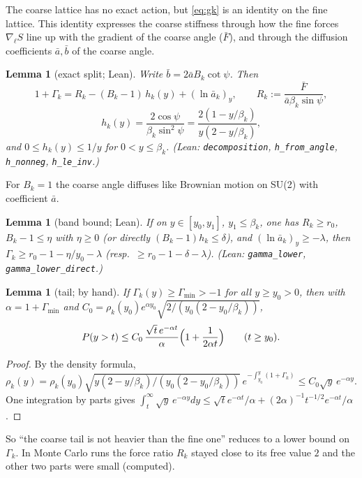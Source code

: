 \documentclass[11pt,a4paper]{article}
\newtheorem{lemma}[theorem]{Lemma}
\theoremstyle{definition}
\theoremstyle{remark}
\newcommand{\code}[1]{\texttt{#1}}
\newcommand{\abar}{\bar a}
\newcommand{\bbar}{\bar b}
\newcommand{\Fbar}{\bar F}
\begin{document}
The coarse lattice has no exact action, but \eqref{eq:gk} is an identity on the fine lattice. This identity expresses the coarse stiffness through how the fine forces $\nabla_\ell S$ line up with the gradient of the coarse angle ($\Fbar$), and through the diffusion coefficients $\abar,\bbar$ of the coarse angle.

\begin{lemma}[exact split; Lean]\label{lem:split}
Write $\bbar=2\abar B_k\cot\psi$. Then
\[
1+\Gamma_k=R_k-(B_k-1)\,h_k(y)+(\ln\abar_k)_y,\qquad R_k:=\frac{\Fbar}{\abar\beta_k\sin\psi},\]\[h_k(y)=\frac{2\cos\psi}{\beta_k\sin^2\psi}=\frac{2(1-y/\beta_k)}{y(2-y/\beta_k)},
\]
and $0\le h_k(y)\le1/y$ for $0<y\le\beta_k$. (Lean: \code{decomposition}, \code{h\_from\_angle}, \code{h\_nonneg}, \code{h\_le\_inv}.)
\end{lemma}

For $B_k=1$ the coarse angle diffuses like Brownian motion on SU(2) with coefficient $\abar$.

\begin{lemma}[band bound; Lean]\label{lem:band}
If on $y\in[y_0,y_1]$, $y_1\le\beta_k$, one has $R_k\ge r_0$, $B_k-1\le\eta$ with $\eta\ge0$ (or directly $(B_k-1)h_k\le\delta$), and $(\ln\abar_k)_y\ge-\lambda$, then $\Gamma_k\ge r_0-1-\eta/y_0-\lambda$ (resp.\ $\ge r_0-1-\delta-\lambda$). (Lean: \code{gamma\_lower}, \code{gamma\_lower\_direct}.)
\end{lemma}

\begin{lemma}[tail; by hand]\label{lem:tail}
If $\Gamma_k(y)\ge\Gamma_{\min}>-1$ for all $y\ge y_0>0$, then with $\alpha=1+\Gamma_{\min}$ and $C_0=\rho_k(y_0)e^{\alpha y_0}\sqrt{2/(y_0(2-y_0/\beta_k))}$,
\[
P(y>t)\le C_0\,\frac{\sqrt t\,e^{-\alpha t}}{\alpha}\Bigl(1+\frac{1}{2\alpha t}\Bigr)\qquad(t\ge y_0).
\]
\end{lemma}

\begin{proof}
By the density formula, $\rho_k(y)=\rho_k(y_0)\sqrt{y(2-y/\beta_k)/(y_0(2-y_0/\beta_k))}\,e^{-\int_{y_0}^y(1+\Gamma_k)}\le C_0\sqrt y\,e^{-\alpha y}$. One integration by parts gives $\int_t^\infty\sqrt y\,e^{-\alpha y}dy\le\sqrt te^{-\alpha t}/\alpha+(2\alpha)^{-1}t^{-1/2}e^{-\alpha t}/\alpha$.
\end{proof}

So ``the coarse tail is not heavier than the fine one'' reduces to a lower bound on $\Gamma_k$. In Monte Carlo runs the force ratio $R_k$ stayed close to its free value $2$ and the other two parts were small (computed).
\end{document}
